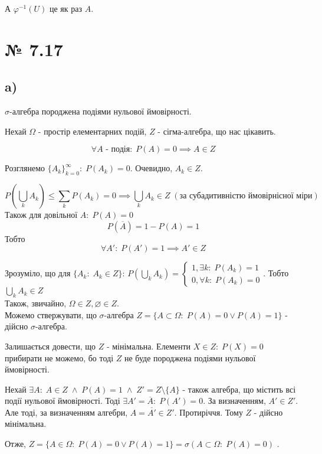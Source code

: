 \documentclass[11pt, a4paper]{article} %
\begin{document}
А $\varphi^{-1}(U)$ це як раз $A$. \qedsymbol

\section*{№ 7.17}
\subsection*{a)}
\begin{mdframed}
    $\sigma$-алгебра породжена подіями нульової ймовірності.
\end{mdframed}
Нехай $\Omega$ - простір елементарних подій, $Z$ - сігма-алгебра, що нас цікавить.

$$\forall A \text{ - подія}:\; P(A)=0 \implies A\in Z$$

Розглянемо $\left.\{A_k\}\right._{k=0}^\infty:\; P(A_k)=0$. Очевидно, $A_k \in Z$.

$$P(\bigcup_k A_k) \le \sum_k P(A_k) = 0 \implies \bigcup_k A_k \in Z \; (\text{за субадитивністю ймовірнісної міри})$$ 
Також для довільної $A:\; P(A)=0$
$$P(\overline{A}) = 1-P(A) = 1$$
Тобто 
$$\forall A':\; P(A')=1 \implies A' \in Z$$

Зрозуміло, що для $\{A_k:\; A_k \in Z\}$: $P(\bigcup_k A_k) = \begin{cases}
    1, \exists k:\; P(A_k) = 1\\
    0, \forall k:\; P(A_k) = 0
\end{cases}$. 
Тобто $\bigcup_k A_k \in Z$\\

Також, звичайно, $\Omega \in Z, \varnothing \in Z$.\\

Можемо ствержувати, що $\sigma$-алгебра $Z = \{A \subset \Omega:\; P(A) = 0 \vee P(A) = 1\}$ -
дійсно $\sigma$-алгебра.

Залишається довести, що $Z$ - мінімальна. 
Елементи $X\in Z:\; P(X)=0$ прибирати не можемо, бо тоді $Z$ не буде породжена подіями нульової ймовірності.

Нехай $\exists A:\; A \in Z \;\wedge\; P(A)=1\;\wedge\; Z' = Z \setminus \{A\} $ - також алгебра, що містить всі події нульової ймовірності.
Тоді $\exists A' = \overline{A}:\; P(A')=0$. За визначенням, $A'\in Z'$. Але тоді, за визначенням алгебри, $A = \overline{A'}\in Z'$.
Протиріччя. Тому $Z$ - дійсно мінімальна.

Отже, $Z = \{A \in \Omega:\; P(A) = 0 \vee P(A) = 1\} = \sigma({A \subset \Omega:\; P(A) = 0})$ \qedsymbol.
\end{document}
